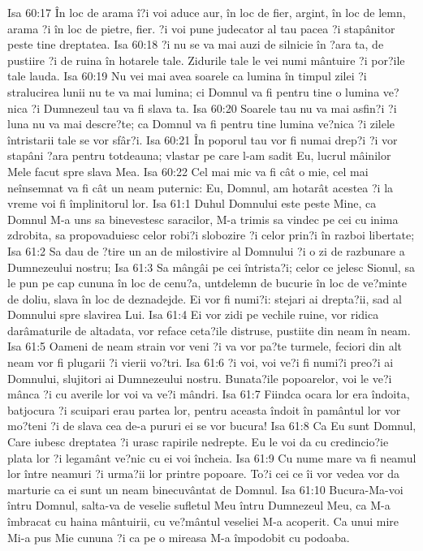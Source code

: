 Isa 60:17  În loc de arama î?i voi aduce aur, în loc de fier, argint, în loc de lemn, arama ?i în loc de pietre, fier. ?i voi pune judecator al tau pacea ?i stapânitor peste tine dreptatea.
Isa 60:18  ?i nu se va mai auzi de silnicie în ?ara ta, de pustiire ?i de ruina în hotarele tale. Zidurile tale le vei numi mântuire ?i por?ile tale lauda.
Isa 60:19  Nu vei mai avea soarele ca lumina în timpul zilei ?i stralucirea lunii nu te va mai lumina; ci Domnul va fi pentru tine o lumina ve?nica ?i Dumnezeul tau va fi slava ta.
Isa 60:20  Soarele tau nu va mai asfin?i ?i luna nu va mai descre?te; ca Domnul va fi pentru tine lumina ve?nica ?i zilele întristarii tale se vor sfâr?i.
Isa 60:21  În poporul tau vor fi numai drep?i ?i vor stapâni ?ara pentru totdeauna; vlastar pe care l-am sadit Eu, lucrul mâinilor Mele facut spre slava Mea.
Isa 60:22  Cel mai mic va fi cât o mie, cel mai neînsemnat va fi cât un neam puternic: Eu, Domnul, am hotarât acestea ?i la vreme voi fi împlinitorul lor.
Isa 61:1  Duhul Domnului este peste Mine, ca Domnul M-a uns sa binevestesc saracilor, M-a trimis sa vindec pe cei cu inima zdrobita, sa propovaduiesc celor robi?i slobozire ?i celor prin?i în razboi libertate;
Isa 61:2  Sa dau de ?tire un an de milostivire al Domnului ?i o zi de razbunare a Dumnezeului nostru;
Isa 61:3  Sa mângâi pe cei întrista?i; celor ce jelesc Sionul, sa le pun pe cap cununa în loc de cenu?a, untdelemn de bucurie în loc de ve?minte de doliu, slava în loc de deznadejde. Ei vor fi numi?i: stejari ai drepta?ii, sad al Domnului spre slavirea Lui.
Isa 61:4  Ei vor zidi pe vechile ruine, vor ridica darâmaturile de altadata, vor reface ceta?ile distruse, pustiite din neam în neam.
Isa 61:5  Oameni de neam strain vor veni ?i va vor pa?te turmele, feciori din alt neam vor fi plugarii ?i vierii vo?tri.
Isa 61:6  ?i voi, voi ve?i fi numi?i preo?i ai Domnului, slujitori ai Dumnezeului nostru. Bunata?ile popoarelor, voi le ve?i mânca ?i cu averile lor voi va ve?i mândri.
Isa 61:7  Fiindca ocara lor era îndoita, batjocura ?i scuipari erau partea lor, pentru aceasta îndoit în pamântul lor vor mo?teni ?i de slava cea de-a pururi ei se vor bucura!
Isa 61:8  Ca Eu sunt Domnul, Care iubesc dreptatea ?i urasc rapirile nedrepte. Eu le voi da cu credincio?ie plata lor ?i legamânt ve?nic cu ei voi încheia.
Isa 61:9  Cu nume mare va fi neamul lor între neamuri ?i urma?ii lor printre popoare. To?i cei ce îi vor vedea vor da marturie ca ei sunt un neam binecuvântat de Domnul.
Isa 61:10  Bucura-Ma-voi întru Domnul, salta-va de veselie sufletul Meu întru Dumnezeul Meu, ca M-a îmbracat cu haina mântuirii, cu ve?mântul veseliei M-a acoperit. Ca unui mire Mi-a pus Mie cununa ?i ca pe o mireasa M-a împodobit cu podoaba.
